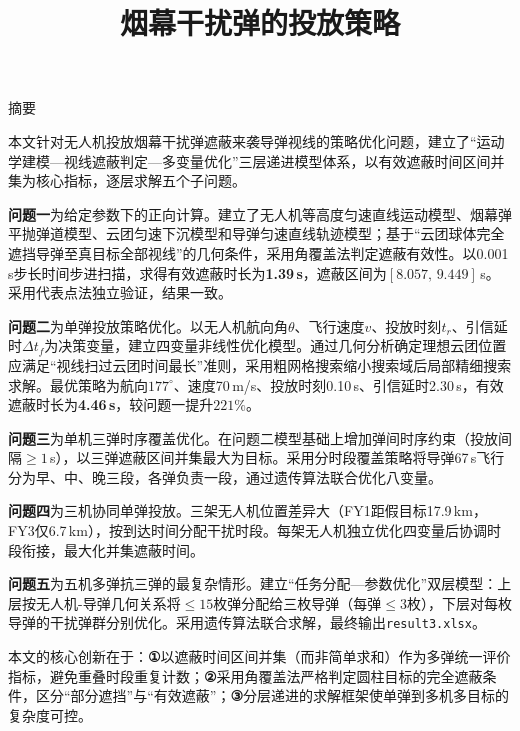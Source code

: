 \documentclass[a4paper]{ctexart}
\title{\zihao{3}\heiti 烟幕干扰弹的投放策略}
\author{}
\date{}
\begin{document}
\maketitle
\thispagestyle{empty}

\begin{center}
\heiti 摘\quad 要
\end{center}


本文针对无人机投放烟幕干扰弹遮蔽来袭导弹视线的策略优化问题，建立了``运动学建模—视线遮蔽判定—多变量优化''三层递进模型体系，以有效遮蔽时间区间并集为核心指标，逐层求解五个子问题。

\textbf{问题一}为给定参数下的正向计算。建立了无人机等高度匀速直线运动模型、烟幕弹平抛弹道模型、云团匀速下沉模型和导弹匀速直线轨迹模型；基于``云团球体完全遮挡导弹至真目标全部视线''的几何条件，采用角覆盖法判定遮蔽有效性。以0.001\,s步长时间步进扫描，求得有效遮蔽时长为\textbf{1.39\,s}，遮蔽区间为$[8.057,\,9.449]$\,s。采用代表点法独立验证，结果一致。

\textbf{问题二}为单弹投放策略优化。以无人机航向角$\theta$、飞行速度$v$、投放时刻$t_r$、引信延时$\Delta t_f$为决策变量，建立四变量非线性优化模型。通过几何分析确定理想云团位置应满足``视线扫过云团时间最长''准则，采用粗网格搜索缩小搜索域后局部精细搜索求解。最优策略为航向$177^\circ$、速度70\,m/s、投放时刻0.10\,s、引信延时2.30\,s，有效遮蔽时长为\textbf{4.46\,s}，较问题一提升$221\%$。

\textbf{问题三}为单机三弹时序覆盖优化。在问题二模型基础上增加弹间时序约束（投放间隔$\geq 1$\,s），以三弹遮蔽区间并集最大为目标。采用分时段覆盖策略将导弹67\,s飞行分为早、中、晚三段，各弹负责一段，通过遗传算法联合优化八变量。

\textbf{问题四}为三机协同单弹投放。三架无人机位置差异大（FY1距假目标17.9\,km，FY3仅6.7\,km），按到达时间分配干扰时段。每架无人机独立优化四变量后协调时段衔接，最大化并集遮蔽时间。

\textbf{问题五}为五机多弹抗三弹的最复杂情形。建立``任务分配—参数优化''双层模型：上层按无人机-导弹几何关系将$\leq 15$枚弹分配给三枚导弹（每弹$\leq 3$枚），下层对每枚导弹的干扰弹群分别优化。采用遗传算法联合求解，最终输出\texttt{result3.xlsx}。

本文的核心创新在于：\textbf{①}以遮蔽时间区间并集（而非简单求和）作为多弹统一评价指标，避免重叠时段重复计数；\textbf{②}采用角覆盖法严格判定圆柱目标的完全遮蔽条件，区分``部分遮挡''与``有效遮蔽''；\textbf{③}分层递进的求解框架使单弹到多机多目标的复杂度可控。
\end{document}
